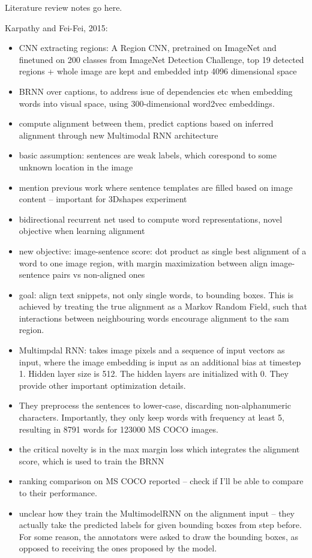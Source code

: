 Literature review notes go here.

Karpathy and Fei-Fei, 2015:
\begin{itemize}
	\item CNN extracting regions: A Region CNN, pretrained on ImageNet and finetuned on 200 classes from ImageNet Detection Challenge, top 19 detected regions + whole image are kept and embedded intp 4096 dimensional space
	\item BRNN over captions, to address isue of dependencies etc when embedding words into visual space, using 300-dimensional word2vec embeddings. 
	\item compute alignment between them, predict captions based on inferred alignment through new Multimodal RNN architecture
	\item basic assumption: sentences are weak labels, which corespond to some unknown location in the image
	\item mention previous work where sentence templates are filled based on image content -- important for 3Dshapes experiment
	\item bidirectional recurrent net used to compute word representations, novel objective when learning alignment
	\item new objective: image-sentence score: dot product as single best alignment of a word to one image region, with margin maximization between align image-sentence pairs vs non-aligned ones
	\item goal: align text snippets, not only single words, to bounding boxes. This is achieved by treating the true alignment as a Markov Random Field, such that interactions between neighbouring words encourage alignment to the sam region.
	\item Multimpdal RNN: takes image pixels and a sequence of input vectors as input, where the image embedding is input as an additional bias at timestep 1. Hidden layer size is 512. The hidden layers are initialized with 0. They provide other important optimization details.
	\item They preprocess the sentences to lower-case, discarding non-alphanumeric characters. Importantly, they only keep words with frequency at least 5, resulting in 8791 words for 123000 MS COCO images. 
	\item the critical novelty is in the max margin loss which integrates the alignment score, which is used to train the BRNN
	\item ranking comparison on MS COCO reported -- check if I'll be able to compare to their performance.
	\item unclear how they train the MultimodelRNN on the alignment input -- they actually take the predicted labels for given bounding boxes from step before. For some reason, the annotators were asked to draw the bounding boxes, as opposed to receiving the ones proposed by the model.
\end{itemize}

